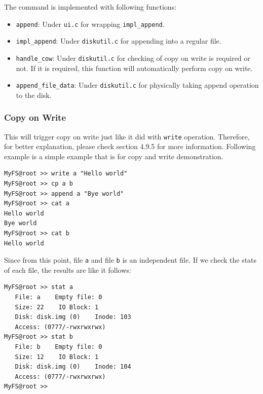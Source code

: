 \documentclass{homework}
\begin{document}
The command is implemented with following functions:
\begin{itemize}
    \item \texttt{append}: Under \texttt{ui.c} for wrapping \texttt{impl_append}. 
    \item \texttt{impl_append}: Under \texttt{diskutil.c} for appending into a regular file.
    \item \texttt{handle_cow}: Under \texttt{diskutil.c} for checking of copy on write is required or not. If it is required, this function will automatically perform copy on write.
    \item \texttt{append_file_data}: Under \texttt{diskutil.c} for physically taking append operation to the disk.
\end{itemize}

\subsubsection{Copy on Write}
This will trigger copy on write just like it did with \texttt{write} operation. Therefore, for better explanation, please check section 4.9.5 for more information. Following example is a simple example that is for copy and write demonstration.
\\
\begin{center}
\begin{code}
\begin{verbatim}
MyFS@root >> write a "Hello world"
MyFS@root >> cp a b
MyFS@root >> append a "Bye world"
MyFS@root >> cat a
Hello world
Bye world
MyFS@root >> cat b
Hello world
\end{verbatim}
\end{code}
\end{center}

Since from this point, file \texttt{a} and file \texttt{b} is an independent file. If we check the stats of each file, the results are like it follows:
\\
\begin{center}
\begin{code}
\begin{verbatim}
MyFS@root >> stat a
   File: a    Empty file: 0
   Size: 22    IO Block: 1
   Disk: disk.img (0)    Inode: 103
   Access: (0777/-rwxrwxrwx)
MyFS@root >> stat b
   File: b    Empty file: 0
   Size: 12    IO Block: 1
   Disk: disk.img (0)    Inode: 104
   Access: (0777/-rwxrwxrwx)
MyFS@root >>
\end{verbatim}
\end{code}
\end{center}
\pagebreak
\end{document}
